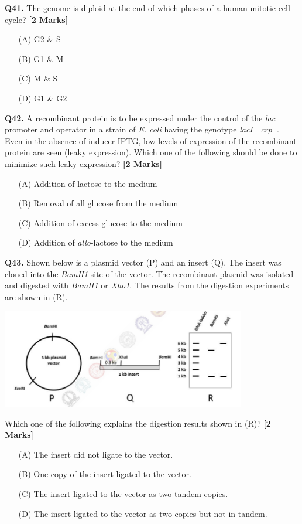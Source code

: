 \documentclass[11pt]{article}
\newcommand{\questionb}[2]{
    \noindent\textbf{Q#2.} #1 \hfill \textbf{[2 Marks]}
}
\begin{document}
\vspace{0.5cm}

\questionb{The genome is diploid at the end of which phases of a human mitotic cell cycle?}{41}
\begin{enumerate}
    \item[(A)] G2 \& S
    \item[(B)] G1 \& M  
    \item[(C)] M \& S
    \item[(D)] G1 \& G2
\end{enumerate}

\vspace{0.5cm}

\questionb{A recombinant protein is to be expressed under the control of the \textit{lac} promoter and operator in a strain of \textit{E. coli} having the genotype \textit{lacI$^+$ crp$^+$}. Even in the absence of inducer IPTG, low levels of expression of the recombinant protein are seen (leaky expression). Which one of the following should be done to minimize such leaky expression?}{42}
\begin{enumerate}
    \item[(A)] Addition of lactose to the medium
    \item[(B)] Removal of all glucose from the medium  
    \item[(C)] Addition of excess glucose to the medium
    \item[(D)] Addition of \textit{allo}-lactose to the medium
\end{enumerate}

\vspace{0.5cm}

\questionb{Shown below is a plasmid vector (P) and an insert (Q). The insert was cloned into the \textit{BamH1} site of the vector. The recombinant plasmid was isolated and digested with \textit{BamH1} or \textit{Xho1}. The results from the digestion experiments are shown in (R).

\begin{center}
\includegraphics[width=0.8\textwidth]{figures/43.png}
\end{center}

Which one of the following explains the digestion results shown in (R)?}{43}
\begin{enumerate}
    \item[(A)] The insert did not ligate to the vector.
    \item[(B)] One copy of the insert ligated to the vector.  
    \item[(C)] The insert ligated to the vector as two tandem copies.
    \item[(D)] The insert ligated to the vector as two copies but not in tandem.
\end{enumerate}
\end{document}
